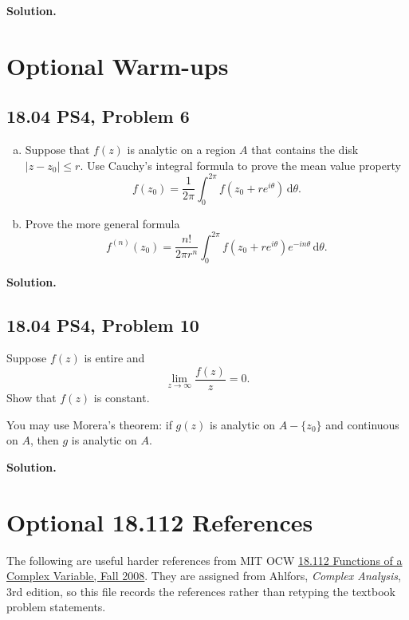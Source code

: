 \documentclass{article}
\newcommand{\dd}{\mathrm{d}}
\newenvironment{solution}{%
  \par\medskip\noindent\textbf{Solution.}\par
}{\par\medskip}
\begin{document}
\begin{solution}
\end{solution}

\section{Optional Warm-ups}

\subsection*{18.04 PS4, Problem 6}

\begin{enumerate}[(a)]
  \item Suppose that $f(z)$ is analytic on a region $A$ that contains the disk
  $|z-z_0|\le r$. Use Cauchy's integral formula to prove the mean value
  property
  \[
    f(z_0)=\frac{1}{2\pi}\int_0^{2\pi}
    f(z_0+re^{i\theta})\,\dd\theta.
  \]

  \item Prove the more general formula
  \[
    f^{(n)}(z_0)
    =
    \frac{n!}{2\pi r^n}
    \int_0^{2\pi}f(z_0+re^{i\theta})e^{-in\theta}\,\dd\theta.
  \]
\end{enumerate}

\begin{solution}
\end{solution}

\subsection*{18.04 PS4, Problem 10}

Suppose $f(z)$ is entire and
\[
  \lim_{z\to\infty}\frac{f(z)}{z}=0.
\]
Show that $f(z)$ is constant.

You may use Morera's theorem: if $g(z)$ is analytic on $A-\{z_0\}$ and
continuous on $A$, then $g$ is analytic on $A$.

\begin{solution}
\end{solution}

\section{Optional 18.112 References}

The following are useful harder references from MIT OCW
\href{https://ocw.mit.edu/courses/18-112-functions-of-a-complex-variable-fall-2008/pages/assignments/}{18.112 Functions of a Complex Variable, Fall 2008}.
They are assigned from Ahlfors, \emph{Complex Analysis}, 3rd edition, so this
file records the references rather than retyping the textbook problem
statements.
\end{document}

